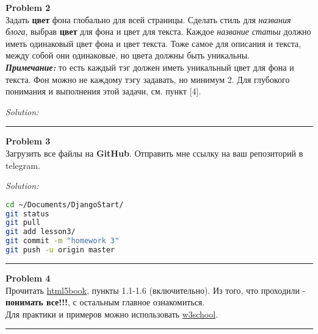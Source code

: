 \documentclass[a4paper, 11pt]{extarticle}
\newenvironment{problem}[2][Problem]
    { \begin{mdframed}[backgroundcolor=gray!20] \textbf{#1 #2} \\}
    {  \end{mdframed}}
\newenvironment{solution}
    {\textit{Solution:}}
    {}
\begin{document}

\begin{problem}{2}
Задать \textbf{цвет} фона глобально для всей страницы. Сделать стиль для \textit{названия блога}, выбрав \textbf{цвет} для фона и цвет для текста. Каждое \textit{название статьи} должно иметь одинаковый цвет фона и цвет текста. Тоже самое для описания и текста, между собой они одинаковые, но цвета должны быть уникальны.\\
\textit{\textbf{Примечание: }}то есть каждый тэг должен иметь уникальный цвет для фона и текста. Фон можно не каждому тэгу задавать, но минимум 2. Для глубокого понимания и выполнения этой задачи, см. пункт [4]. %
\end{problem}
\begin{solution} 
\vspace{-1.5em}

\vspace{-0.5em}
\end{solution} 
\noindent\rule{6.257in}{2.8pt}

\begin{problem}{3}
Загрузить все файлы на \textbf{GitHub}. Отправить мне ссылку на ваш репозиторий в telegram.
\end{problem}
\begin{solution} 
\begin{lstlisting}[language=Bash]
cd ~/Documents/DjangoStart/
git status
git pull
git add lesson3/
git commit -m "homework 3"
git push -u origin master
\end{lstlisting}
\end{solution} 
\noindent\rule{6.257in}{2.8pt}

\begin{problem}{4}\label{problem4}
Прочитать \href{https://html5book.ru/html-html5}{html5book}, пункты 1.1-1.6 (включительно). Из того, что проходили - \textbf{понимать все!!!}, с остальным главное ознакомиться.\\
Для практики и примеров можно использовать \href{https://www.w3schools.com}{w3school}. 
\end{problem}
\noindent\rule{6.257in}{2.8pt}
\end{document}

